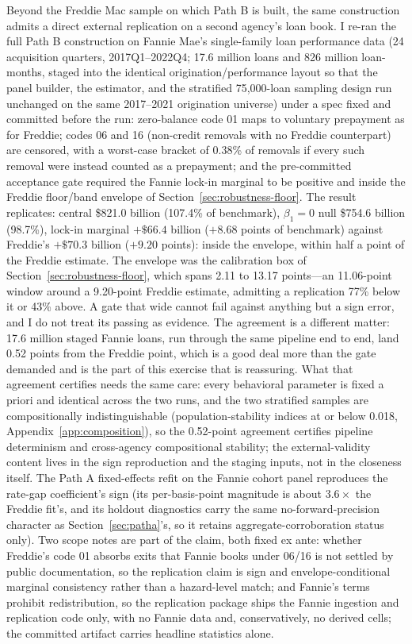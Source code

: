 \documentclass[12pt]{article}
\begin{document}
Beyond the Freddie Mac sample on which Path B is built, the same construction admits a direct external replication on a second agency's loan book. I re-ran the full Path B construction on Fannie Mae's single-family loan performance data (24 acquisition quarters, 2017Q1--2022Q4; 17.6 million loans and 826 million loan-months, staged into the identical origination/performance layout so that the panel builder, the estimator, and the stratified 75{,}000-loan sampling design run unchanged on the same 2017--2021 origination universe) under a spec fixed and committed before the run: zero-balance code 01 maps to voluntary prepayment as for Freddie; codes 06 and 16 (non-credit removals with no Freddie counterpart) are censored, with a worst-case bracket of 0.38\% of removals if every such removal were instead counted as a prepayment; and the pre-committed acceptance gate required the Fannie lock-in marginal to be positive and inside the Freddie floor/band envelope of Section~\ref{sec:robustness-floor}. The result replicates: central \$821.0 billion (107.4\% of benchmark), $\beta_1 = 0$ null \$754.6 billion (98.7\%), lock-in marginal $+\$66.4$ billion ($+8.68$ points of benchmark) against Freddie's $+\$70.3$ billion ($+9.20$ points): inside the envelope, within half a point of the Freddie estimate. The envelope was the calibration box of Section~\ref{sec:robustness-floor}, which spans 2.11 to 13.17 points---an 11.06-point window around a 9.20-point Freddie estimate, admitting a replication 77\% below it or 43\% above. A gate that wide cannot fail against anything but a sign error, and I do not treat its passing as evidence. The agreement is a different matter: 17.6 million staged Fannie loans, run through the same pipeline end to end, land 0.52 points from the Freddie point, which is a good deal more than the gate demanded and is the part of this exercise that is reassuring. What that agreement certifies needs the same care: every behavioral parameter is fixed a priori and identical across the two runs, and the two stratified samples are compositionally indistinguishable (population-stability indices at or below 0.018, Appendix~\ref{app:composition}), so the 0.52-point agreement certifies pipeline determinism and cross-agency compositional stability; the external-validity content lives in the sign reproduction and the staging inputs, not in the closeness itself. The Path A fixed-effects refit on the Fannie cohort panel reproduces the rate-gap coefficient's sign (its per-basis-point magnitude is about $3.6\times$ the Freddie fit's, and its holdout diagnostics carry the same no-forward-precision character as Section~\ref{sec:patha}'s, so it retains aggregate-corroboration status only). Two scope notes are part of the claim, both fixed ex ante: whether Freddie's code 01 absorbs exits that Fannie books under 06/16 is not settled by public documentation, so the replication claim is sign and envelope-conditional marginal consistency rather than a hazard-level match; and Fannie's terms prohibit redistribution, so the replication package ships the Fannie ingestion and replication code only, with no Fannie data and, conservatively, no derived cells; the committed artifact carries headline statistics alone.
\end{document}
